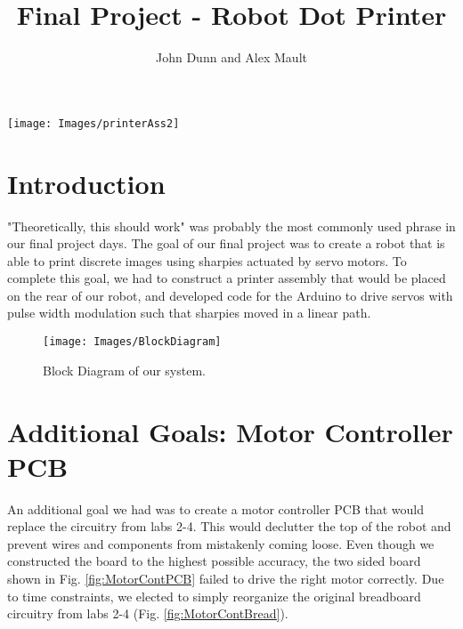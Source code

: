 \documentclass[11pt, oneside]{article}
\title{Final Project - Robot Dot Printer}
\author{John Dunn and Alex Mault}
\begin{document}
\begin{singlespace}

	\maketitle
	
	
	\begin{center}
		\texttt{[image: Images/printerAss2]} 
	\end{center}
	
\end{singlespace}

\newpage

\section{Introduction}
"Theoretically, this should work" was probably the most commonly used phrase in our final project days. The goal of our final project was to create a robot that is able to print discrete images using sharpies actuated by servo motors. To complete this goal, we had to construct a printer assembly that would be placed on the rear of our robot, and developed code for the Arduino to drive servos with pulse width modulation such that sharpies moved in a linear path.
\begin{figure}[H]
    \centering
    \texttt{[image: Images/BlockDiagram]}
    \caption{Block Diagram of our system.}
    \label{fig:blockDiagram}
\end{figure}



\section{Additional Goals: Motor Controller PCB}
An additional goal we had was to create a motor controller PCB that would replace the circuitry from labs 2-4. This would declutter the top of the robot and prevent wires and components from mistakenly coming loose. Even though we constructed the board to the highest possible accuracy, the two sided board shown in Fig. \ref{fig:MotorContPCB} failed to drive the right motor correctly. Due to time constraints, we elected to simply reorganize the original breadboard circuitry from labs 2-4 (Fig. \ref{fig:MotorContBread}).
\end{document}
